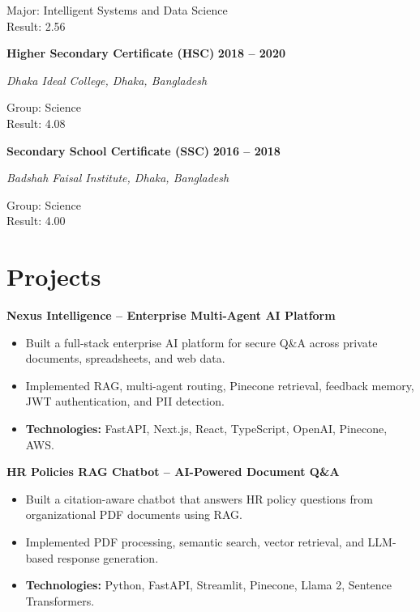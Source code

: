 ﻿\documentclass[10pt,a4paper]{article}
\begin{document}
Major: Intelligent Systems and Data Science \\
Result: 2.56

\vspace{2mm}

\textbf{Higher Secondary Certificate (HSC)}
\hfill
\textbf{2018 -- 2020}

\textit{Dhaka Ideal College, Dhaka, Bangladesh}

Group: Science \\
Result: 4.08

\vspace{2mm}

\textbf{Secondary School Certificate (SSC)}
\hfill
\textbf{2016 -- 2018}

\textit{Badshah Faisal Institute, Dhaka, Bangladesh}

Group: Science \\
Result: 4.00


\section{Projects}

\textbf{Nexus Intelligence -- Enterprise Multi-Agent AI Platform}

\begin{itemize}

\item Built a full-stack enterprise AI platform for secure Q\&A across private documents, spreadsheets, and web data.

\item Implemented RAG, multi-agent routing, Pinecone retrieval, feedback memory, JWT authentication, and PII detection.

\item \textbf{Technologies:} FastAPI, Next.js, React, TypeScript, OpenAI, Pinecone, AWS.

\end{itemize}

\textbf{HR Policies RAG Chatbot -- AI-Powered Document Q\&A}

\begin{itemize}

\item Built a citation-aware chatbot that answers HR policy questions from organizational PDF documents using RAG.

\item Implemented PDF processing, semantic search, vector retrieval, and LLM-based response generation.

\item \textbf{Technologies:} Python, FastAPI, Streamlit, Pinecone, Llama 2, Sentence Transformers.

\end{itemize}
\end{document}
